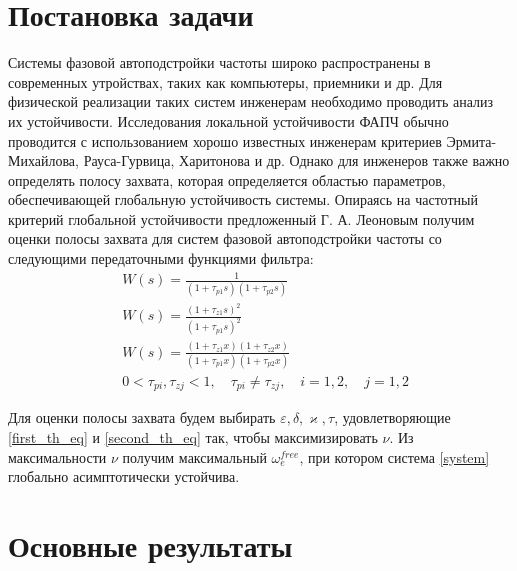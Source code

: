 \documentclass[a4paper,article,14pt]{extarticle}
\begin{document}

\newpage
\section{Постановка задачи}
Системы фазовой автоподстройки частоты широко распространены в современных утройствах, таких как компьютеры, приемники и др. Для физической реализации таких систем инженерам необходимо проводить анализ их устойчивости. Исследования локальной устойчивости ФАПЧ обычно проводится с использованием хорошо известных инженерам критериев Эрмита-Михайлова, Рауса-Гурвица, Харитонова и др. Однако для инженеров также важно определять полосу захвата, которая определяется областью параметров, обеспечивающей глобальную устойчивость системы. Опираясь на частотный критерий глобальной устойчивости предложенный Г. А. Леоновым получим оценки полосы захвата для систем фазовой автоподстройки частоты со следующими передаточными функциями фильтра: 
 \begin{align}
&W(s) = \frac{1}{(1+\tau_{p1}s)(1+\tau_{p2}s)}\\[5pt]
&W(s) = \frac{(1+\tau_{z1}s)^2}{(1+\tau_{p1}s)^2}\\[5pt]
&W(s) = \frac{(1+\tau_{z1}x)(1+\tau_{z2}x)}{(1+\tau_{p1}x)(1+\tau_{p2}x)}\\
&0<\tau_{pi},\tau_{zj} < 1, \quad \tau_{pi} \neq \tau_{zj}, \quad i=1,2, \quad j=1,2
 \end{align}
 
 Для оценки полосы захвата будем выбирать $\varepsilon, \delta, \varkappa, \tau$, удовлетворяющие \eqref{first_th_eq} и \eqref{second_th_eq} так, чтобы максимизировать $\nu$. Из максимальности $\nu$ получим максимальный $\omega_e^{free}$, при котором система \eqref{system} глобально асимптотически устойчива.
 

\pagebreak
\section{Основные результаты}
\end{document}

